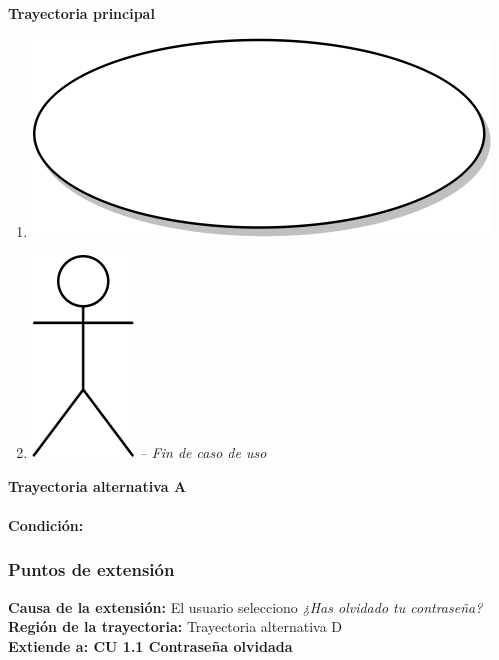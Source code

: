 	\textbf{	\large{Trayectoria principal}} \\ 
		\begin{enumerate}
				\item  { \includegraphics[scale=.08]{Capitulo3/img/proceso.png}}
        		\item {\includegraphics[scale=.18]{Capitulo3/img/actor.png} }
			\textit{-- Fin de caso de uso}			
				\\	
		\end{enumerate}
		
		\textbf{	\large{Trayectoria alternativa A}} \\  
		\\
		\textbf{Condición: }
		\\	

\subsubsection{Puntos de extensión }
\textbf{Causa de la extensión:} El usuario selecciono \textit{ ¿Has olvidado tu contraseña?} \\
\textbf{Región de la trayectoria: } Trayectoria alternativa D \\
\textbf{Extiende a: CU 1.1 Contraseña olvidada}\\ 
